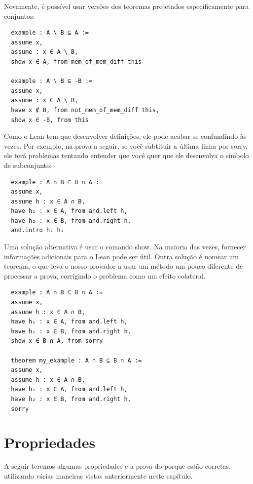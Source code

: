   Novamente, é possível usar versões dos teoremas projetados especificamente para conjuntos:

  \begin{lstlisting}
  example : A \ B ⊆ A :=
  assume x,
  assume : x ∈ A \ B,
  show x ∈ A, from mem_of_mem_diff this

  example : A \ B ⊆ -B :=
  assume x,
  assume : x ∈ A \ B,
  have x ∉ B, from not_mem_of_mem_diff this,
  show x ∈ -B, from this \end{lstlisting}

  Como o Lean tem que desenvolver definições, ele pode acabar se confundindo às vezes. Por exemplo, na prova a seguir, se você subtituir a última linha por {\selectfont sorry}, ele terá problemas tentando entender que você quer que ele desenvolva o símbolo de subconjunto:

  \begin{lstlisting}
  example : A ∩ B ⊆ B ∩ A :=
  assume x,
  assume h : x ∈ A ∩ B,
  have h₁ : x ∈ A, from and.left h,
  have h₂ : x ∈ B, from and.right h,
  and.intro h₂ h₁ \end{lstlisting}

  Uma solução alternativa é usar o comando {\selectfont show}. Na maioria das vezes, fornecer informações adicionais para o Lean pode ser útil. Outra solução é nomear um teorema, o que leva o nosso provador a usar um método um pouco diferente de processar a prova, corrigindo o problema como um efeito colateral.
  
  \begin{lstlisting}
  example : A ∩ B ⊆ B ∩ A :=
  assume x,
  assume h : x ∈ A ∩ B,
  have h₁ : x ∈ A, from and.left h,
  have h₂ : x ∈ B, from and.right h,
  show x ∈ B ∩ A, from sorry

  theorem my_example : A ∩ B ⊆ B ∩ A :=
  assume x,
  assume h : x ∈ A ∩ B,
  have h₁ : x ∈ A, from and.left h,
  have h₂ : x ∈ B, from and.right h,
  sorry \end{lstlisting}

\section{Propriedades}
A seguir teremos algumas propriedades e a prova do porque estão corretas, utilizando várias maneiras vistas anteriormente neste capítulo.

